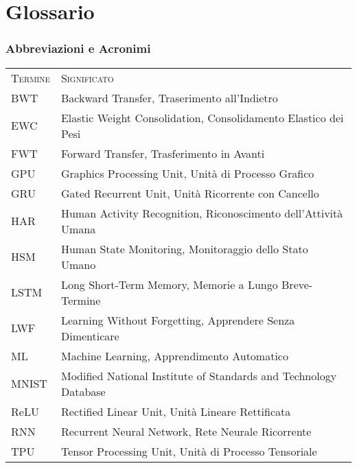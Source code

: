 \chapter*{Glossario}

\subsection*{Abbreviazioni e Acronimi}
\begin{table}[h!]
	\begin{center}
		\begin{tabularx}{\textwidth}{ll}
			\toprule
			\textsc{Termine} & \textsc{Significato} \\ 
			BWT & Backward Transfer, Traserimento all'Indietro\\
			EWC & Elastic Weight Consolidation, Consolidamento Elastico dei Pesi\\
			FWT & Forward Transfer, Trasferimento in Avanti\\
			GPU & Graphics Processing Unit, Unità di Processo Grafico\\
			GRU & Gated Recurrent Unit, Unità Ricorrente con Cancello\\  %
			HAR & Human Activity Recognition, Riconoscimento dell'Attività Umana\\
			HSM & Human State Monitoring, Monitoraggio dello Stato Umano\\
			LSTM & Long Short-Term Memory, Memorie a Lungo Breve-Termine\\
			LWF & Learning Without Forgetting, Apprendere Senza Dimenticare\\
			ML & Machine Learning, Apprendimento Automatico\\
			MNIST & Modified National Institute of Standards and Technology Database\\
			ReLU & Rectified Linear Unit, Unità Lineare Rettificata\\
			RNN & Recurrent Neural Network, Rete Neurale Ricorrente\\
			TPU & Tensor Processing Unit, Unità di Processo Tensoriale\\
		\end{tabularx}
	\end{center}
\end{table}